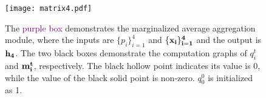 \documentclass{article} \usepackage{iclr2019_conference,times}
\begin{document}
  \begin{figure}[!t]
  	\begin{center}
  		\texttt{[image: matrix4.pdf]}
  		\vspace{-3mm}
  		\caption{{The \textcolor{purple}{purple box} demonstrates the marginalized average aggregation module, where the inputs are $\{p_{i}\}_{i=1}^{4}$ and $ \{\bf{x}_{i}\}_{i=1}^{4}$ and the output is $ \bf{h}_{4} $. The two black boxes demonstrate the computation graphs of $q^t_i$ and $\bf{m}^{t}_{i}$, respectively. The black hollow point indicates its value is 0, while the value of the black solid point is non-zero. $q_{0}^{0}$ is initialized as 1.}}
  		\label{fig:graph}
  		\vspace{-2mm}
  	\end{center}
  \end{figure}
  \vspace{-2mm}
\end{document}
